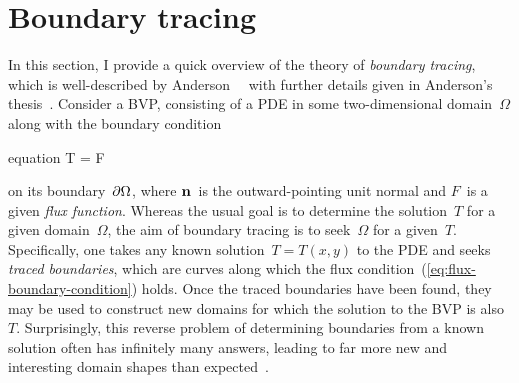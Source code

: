 \section{Boundary tracing}
\label{sec:introduction.tracing}

In this section, I provide a quick overview of
the theory of \emph{boundary tracing},
which is well-described by
Anderson~\etal~\cite{anderson-2007-boundary-tracing-i-theory}
with further details given in
Anderson's thesis~\cite{anderson-2002-thesis-boundary-tracing-pdes}.
Consider a BVP\@, consisting of
a PDE in some two-dimensional domain~$\Omega$
along with the boundary condition
\begin{important}{equation}
  \normalvec \dotp \del T = F 
  \label{eq:flux-boundary-condition}
\end{important}
on its boundary~$\mathop{}\!\partial\Omega$,
where $\mathop{}\!\boldsymbol{\mathrm{n}}$~is the outward-pointing unit normal
and $F$~is a given \emph{flux function}.
Whereas the usual goal is
to determine the solution~$T$ for a given domain~$\Omega$,
the aim of boundary tracing is
to seek~$\Omega$ for a given~$T$.
Specifically, one takes any known solution~$T = T (x, y)$ to the PDE
and seeks \emph{traced boundaries}, which are curves
along which the flux condition~(\ref{eq:flux-boundary-condition}) holds.
Once the traced boundaries have been found,
they may be used to construct new domains
for which the solution to the BVP is also~$T$.
Surprisingly, this reverse problem
of determining boundaries from a known solution
often has infinitely many answers,
leading to far more new and interesting domain shapes
than expected~\cite{anderson-2007-boundary-tracing-ii-applications}.

